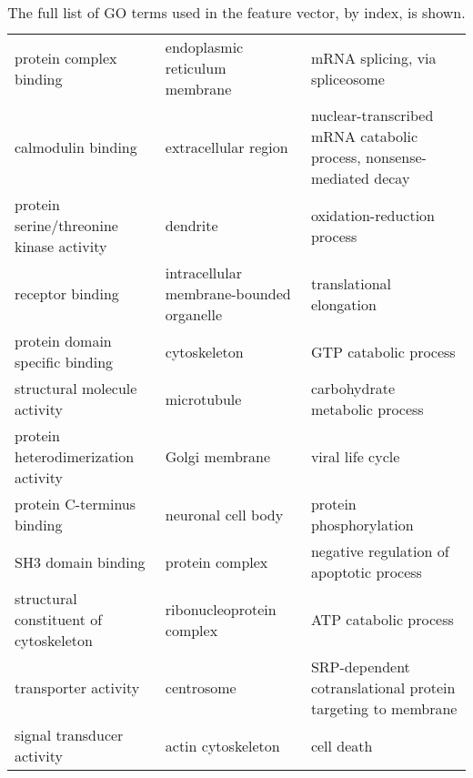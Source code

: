 \begin{table}
\begin{tabular}{p{} p{} p{}}
        protein complex binding & endoplasmic reticulum membrane & mRNA splicing, via spliceosome \\
        calmodulin binding & extracellular region & nuclear-transcribed mRNA catabolic process, nonsense-mediated decay \\
        protein serine/threonine kinase activity & dendrite & oxidation-reduction process \\
        receptor binding & intracellular membrane-bounded organelle & translational elongation \\
        protein domain specific binding & cytoskeleton & GTP catabolic process \\
        structural molecule activity & microtubule & carbohydrate metabolic process \\
        protein heterodimerization activity & Golgi membrane & viral life cycle \\
        protein C-terminus binding & neuronal cell body & protein phosphorylation \\
        SH3 domain binding & protein complex & negative regulation of apoptotic process \\
        structural constituent of cytoskeleton & ribonucleoprotein complex & ATP catabolic process \\
        transporter activity & centrosome & SRP-dependent cotranslational protein targeting to membrane \\
        signal transducer activity & actin cytoskeleton & cell death \\
    \end{tabular}
    \caption{The full list of GO terms used in the feature vector, by index, is shown.}
    \label{apptab:extrago}
\end{table}
